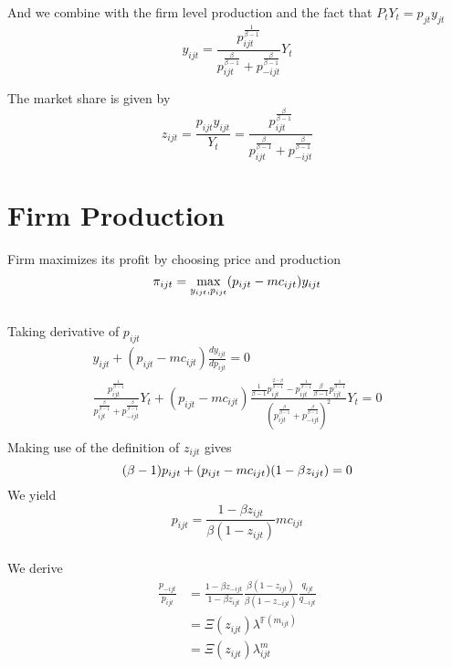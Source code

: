 \documentclass[12pt]{article} %
\begin{document}
And we combine with the firm level production and the fact that $P_t Y_t = p_{jt} y_{jt}$
\[\begin{equation}
	y_{ijt} = \frac{p_{ijt}^{\frac{1}{\beta-1}}}{p_{ijt}^\frac{\beta}{\beta-1}+p_{-ijt}^\frac{\beta}{\beta-1}} Y_t
\end{equation}\] 

The market share is given by
\[\begin{equation}
	z_{ijt} = \frac{p_{ijt}y_{ijt}}{Y_t} = \frac{p_{ijt}^{\frac{\beta}{\beta-1}}}{p_{ijt}^\frac{\beta}{\beta-1}+p_{-ijt}^\frac{\beta}{\beta-1}}
\end{equation}\]

\section{Firm Production}
Firm maximizes its profit by choosing price and production
\[\begin{equation}
	\pi_{ijt} = \max_{y_{ijt},p_{ijt}} (p_{ijt}-mc_{ijt})y_{ijt}\\
\end{equation}\]\\
Taking derivative of $p_{ijt}$
\[\begin{align*}
	y_{ijt} +(p_{ijt}-mc_{ijt})\frac{dy_{ijt}}{dp_{ijt}} = 0\\
	\frac{p_{ijt}^{\frac{1}{\beta-1}}}{p_{ijt}^\frac{\beta}{\beta-1}+p_{-ijt}^\frac{\beta}{\beta-1}} Y_t
	+ (p_{ijt}-mc_{ijt})\frac{\frac{1}{\beta-1}p_{ijt}^\frac{2-\beta}{\beta-1}-p_{ijt}^\frac{1}{\beta-1}\frac{\beta}{\beta-1}p_{ijt}^\frac{1}{\beta-1}}{(p_{ijt}^\frac{\beta}{\beta-1}+p_{-ijt}^\frac{\beta}{\beta-1})^2} Y_t = 0\\
\end{align*}\]
Making use of the definition of $z_{ijt}$ gives
\[
	(\beta-1)p_{ijt} + (p_{ijt}-mc_{ijt})(1-\beta z_{ijt})=0\\
\]
We yield
\[\begin{equation}
	p_{ijt} = \frac{1-\beta z_{ijt}}{\beta(1-z_{ijt})}mc_{ijt}
\end{equation}\]\\
We derive
\[\begin{aligned}
	\frac{p_{-ijt}}{p_{ijt}} &= \frac{1-\beta z_{-ijt}}{1-\beta z_{ijt}} \frac{\beta(1-z_{ijt})}{\beta(1-z_{-ijt})} \frac{q_{ijt}}{q_{-ijt}}\\
	&=\Xi(z_{ijt})\lambda^{\mathbb{F}(m_{ijt})}\\
	&=\Xi(z_{ijt})\lambda^m_{ijt}
\end{aligned}\]\\
\end{document}
